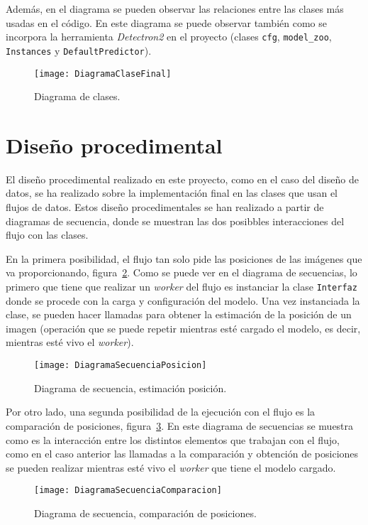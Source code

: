 Además, en el diagrama se pueden observar las relaciones entre las clases más usadas en el código. En este diagrama se puede observar también como se incorpora la herramienta \textit{Detectron2} en el proyecto (clases \texttt{cfg}, \texttt{model\_zoo}, \texttt{Instances} y \texttt{DefaultPredictor}).

\begin{landscape}
	\begin{figure}[h]
		\centering
		\texttt{[image: DiagramaClaseFinal]}
		\caption{Diagrama de clases.}
		\label{fig:diacla}
	\end{figure}	
\end{landscape}

\section{Diseño procedimental}

El diseño procedimental realizado en este proyecto, como en el caso del diseño de datos, se ha realizado sobre la implementación final en las clases que usan el flujos de datos. Estos diseño procedimentales se han realizado a partir de diagramas de secuencia, donde se muestran las dos posibbles interacciones del flujo con las clases.

En la primera posibilidad, el flujo tan solo pide las posiciones de las imágenes que va proporcionando, figura~\ref{fig:diasec1}. Como se puede ver en el diagrama de secuencias, lo primero que tiene que realizar un \textit{worker} del flujo es instanciar la clase \texttt{Interfaz} donde se procede con la carga y configuración del modelo. Una vez instanciada la clase, se pueden hacer llamadas para obtener la estimación de la posición de un imagen (operación que se puede repetir mientras esté cargado el modelo, es decir, mientras esté vivo el \textit{worker}).

\begin{figure}[h]
	\centering
	\texttt{[image: DiagramaSecuenciaPosicion]}
	\caption{Diagrama de secuencia, estimación posición.}
	\label{fig:diasec1}
\end{figure}

Por otro lado, una segunda posibilidad de la ejecución con el flujo es la comparación de posiciones, figura~\ref{fig:diasec2}. En este diagrama de secuencias se muestra como es la interacción entre los distintos elementos que trabajan con el flujo, como en el caso anterior las llamadas a la comparación y obtención de posiciones se pueden realizar mientras esté vivo el \textit{worker} que tiene el modelo cargado.

\begin{figure}[h]
	\centering
	\texttt{[image: DiagramaSecuenciaComparacion]}
	\caption{Diagrama de secuencia, comparación de posiciones.}
	\label{fig:diasec2}
\end{figure}


